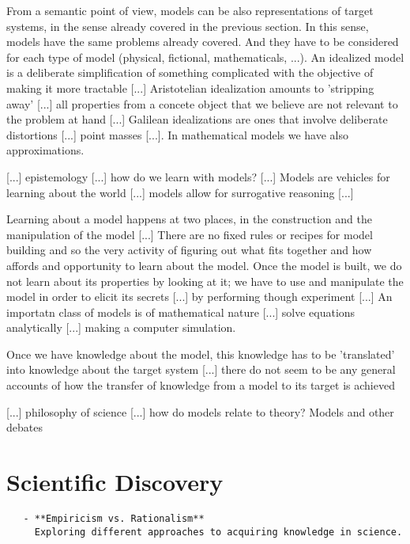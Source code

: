 From a semantic point of view, models can be also representations of target systems, in the sense already covered in the previous section. In this sense, models have the same problems already covered. And they have to be considered for each type of model (physical, fictional, mathematicals, ...). An idealized model {\color{red} is a deliberate simplification of something complicated with the objective of making it more tractable [...] Aristotelian idealization amounts to 'stripping away' [...] all properties from a concete object that we believe are not relevant to the problem at hand [...] Galilean idealizations are ones that involve deliberate distortions [...] point masses [...].} In mathematical models we have also approximations.

{\color{red} [...] epistemology [...] how do we learn with models? [...] Models are vehicles for learning about the world [...] models allow for surrogative reasoning [...]}

{\color{red} Learning about a model happens at two places, in the construction and the manipulation of the model [...] There are no fixed rules or recipes for model building and so the very activity of figuring out what fits together and how affords and opportunity to learn about the model. Once the model is built, we do not learn about its properties by looking at it; we have to use and manipulate the model in order to elicit its secrets [...] by performing though experiment [...] An importatn class of models is of mathematical nature [...] solve equations analytically [...] making a computer simulation.}

{\color{red} Once we have knowledge about the model, this knowledge has to be 'translated' into knowledge about the target system [...] there do not seem to be any general accounts of how the transfer of knowledge from a model to its target is achieved}

{\color{red} [...] philosophy of science [...] how do models relate to theory? Models and other debates} 


%
%

\section{Scientific Discovery}

\begin{verbatim}
   - **Empiricism vs. Rationalism**  
     Exploring different approaches to acquiring knowledge in science.
\end{verbatim}

